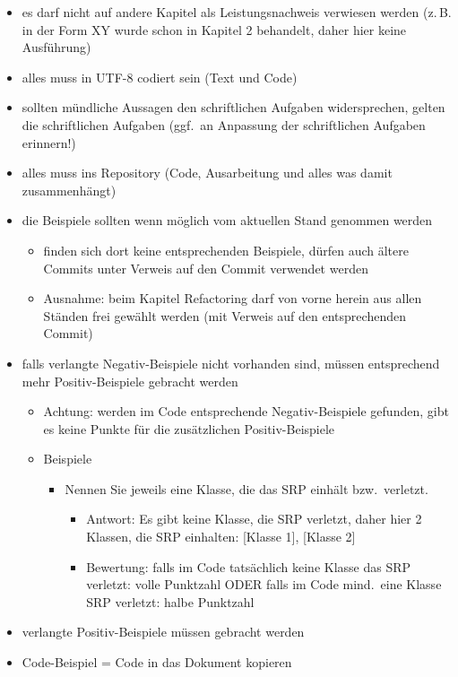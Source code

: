 \documentclass[a4paper,12pt]{article}
\begin{document}
\begin{itemize}
    \item es darf nicht auf andere Kapitel als Leistungsnachweis verwiesen werden
          (z.\,B. in der Form \glqq{}XY wurde schon in Kapitel 2 behandelt, daher hier keine
          Ausführung\grqq{})
    \item alles muss in UTF-8 codiert sein (Text und Code)
    \item sollten mündliche Aussagen den schriftlichen Aufgaben widersprechen, gelten die
          schriftlichen Aufgaben (ggf.\ an Anpassung der schriftlichen Aufgaben erinnern!)
    \item alles muss ins Repository (Code, Ausarbeitung und alles was damit zusammenhängt)
    \item die Beispiele sollten wenn möglich vom aktuellen Stand genommen werden
          \begin{itemize}
              \item finden sich dort keine entsprechenden Beispiele, dürfen auch ältere Commits
                    unter Verweis auf den Commit verwendet werden
              \item Ausnahme: beim Kapitel \glqq{}Refactoring\grqq{} darf von vorne herein aus
                    allen Ständen frei gewählt werden (mit Verweis auf den entsprechenden Commit)
          \end{itemize}
    \item falls verlangte Negativ-Beispiele nicht vorhanden sind, müssen entsprechend mehr
          Positiv-Beispiele gebracht werden
          \begin{itemize}
              \item Achtung: werden im Code entsprechende Negativ-Beispiele gefunden, gibt es
                    keine Punkte für die zusätzlichen Positiv-Beispiele
              \item Beispiele
                    \begin{itemize}
                        \item \glqq{}Nennen Sie jeweils eine Klasse, die das SRP einhält bzw.\ verletzt.\grqq{}
                              \begin{itemize}
                                  \item Antwort: Es gibt keine Klasse, die SRP verletzt, daher hier 2 Klassen,
                                        die SRP einhalten: [Klasse 1], [Klasse 2]
                                  \item Bewertung: falls im Code tatsächlich keine Klasse das SRP verletzt:
                                        volle Punktzahl ODER falls im Code mind.\ eine Klasse SRP verletzt:
                                        halbe Punktzahl
                              \end{itemize}
                    \end{itemize}
          \end{itemize}
    \item verlangte Positiv-Beispiele müssen gebracht werden
    \item Code-Beispiel = Code in das Dokument kopieren
\end{itemize}
\end{document}
